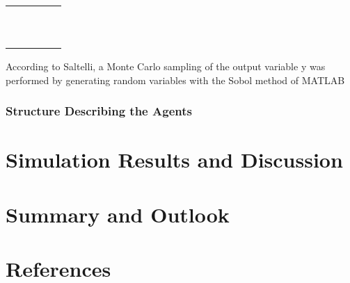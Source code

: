 \documentclass[11pt]{article}
\begin{document}
\begin{table}[h]
\begin{tabular}{|l|cccc|}
\hline
 &  &  &  &  \\ \hline
 &  &  &  &  \\ \hline
 &  &  &  &  \\ \hline
 &  &  &  &  \\ \hline
 &  &  &  &  \\ \hline
 &  &  &  &  \\ \hline
 &  &  &  &  \\ \hline
 &  &  &  &  \\ \hline
 &  &  &  &  \\ \hline
 &  &  &  &  \\ \hline
 &  &  &  &  \\ \hline
\end{tabular}
\end{table}


According to Saltelli, a Monte Carlo sampling of the output variable y was performed by generating random variables with the Sobol method of MATLAB





\subsubsection{Structure Describing the Agents}


\section{Simulation Results and Discussion}





\section{Summary and Outlook}

\section{References}
\end{document}
